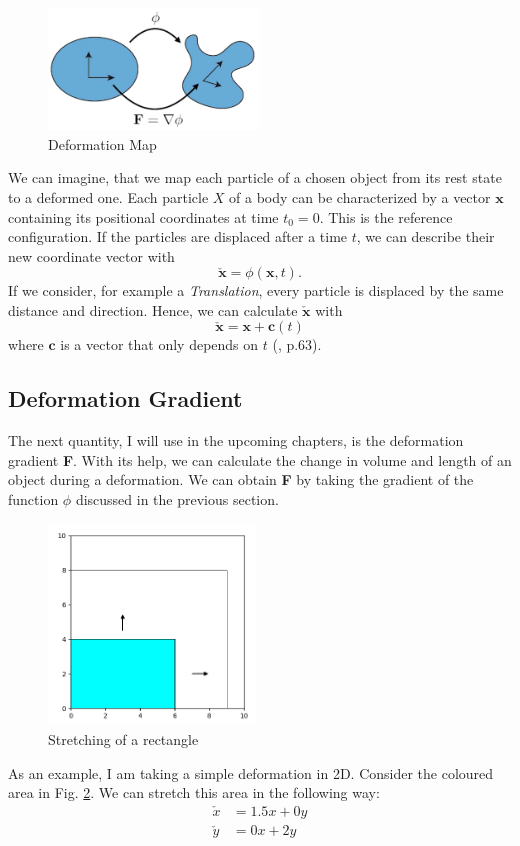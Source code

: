 \begin{figure}[!htbp]
	\centering
	\includegraphics[width=0.5\textwidth]{resources/deformation_map}
	\caption{Deformation Map {\cite{STREAM2018}}}
	\label{fig:deformationmap}
\end{figure}

We can imagine, that we map each particle of a chosen object from its rest state to a deformed one. Each particle $X$ of a body can be characterized by a vector $\mathbf{x}$ containing its positional coordinates at time $t_0=0$. This is the reference configuration. If the particles are displaced after a time $t$, we can describe their new coordinate vector with 
\[
	\check{\mathbf{x}} = \phi (\mathbf{x}, t).
\]
If we consider, for example a \textit{Translation}, every particle is displaced by the same distance and direction. Hence, we can calculate $\check{\mathbf{x}}$ with
\[
	\check{\mathbf{x}} = \mathbf{x} + \mathbf{c}(t)
\]
where $\mathbf{c}$ is a vector that only depends on $t$ (\cite{Spencer1980}, p.63).



\subsection{Deformation Gradient}
The next quantity, I will use in the upcoming chapters, is the deformation gradient \textbf{F}. With its help, we can calculate the change in volume and length of an object during a deformation. We can obtain \textbf{F} by taking the gradient of the function $\phi$ discussed in the previous section.

\begin{figure}
\centering
	\includegraphics[width=5.5cm]{resources/stretch_plot.png}
	\caption{Stretching of a rectangle}
	\label{stretch:1}
\end{figure} 
As an example, I am taking a simple deformation in 2D. Consider the coloured area in Fig. \ref{stretch:1}. We can stretch this area in the following way:
\begin{align*}
	\check{x} &= 1.5x + 0y		\\
	\check{y} &= 0x + 2y	
\end{align*}


